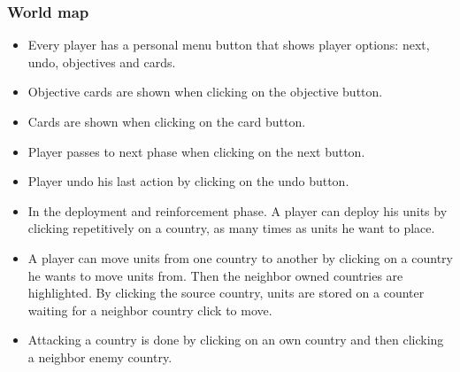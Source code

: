 \documentclass[12pt,a4paper]{article}
\begin{document}
\subsubsection{World map}

\begin{itemize}
\item Every player has a personal menu button that shows player 
  options: next, undo, objectives and cards.
\item Objective cards are shown when clicking on the objective button.
\item Cards are shown when clicking on the card button.
\item Player passes to next phase when clicking on the next button.
\item Player undo his last action by clicking on the undo button.
\item In the deployment and reinforcement phase. A player can deploy
  his units by clicking repetitively on a country, as many times as units
  he want to place.
\item A player can move units from one country to another by clicking
  on a country he wants to move units from. Then the neighbor owned
  countries are highlighted. By clicking the source country, units are 
  stored on a counter waiting for a neighbor country click to move.
\item Attacking a country is done by clicking on an own country and
  then clicking a neighbor enemy country.
\end{itemize}
\end{document}

